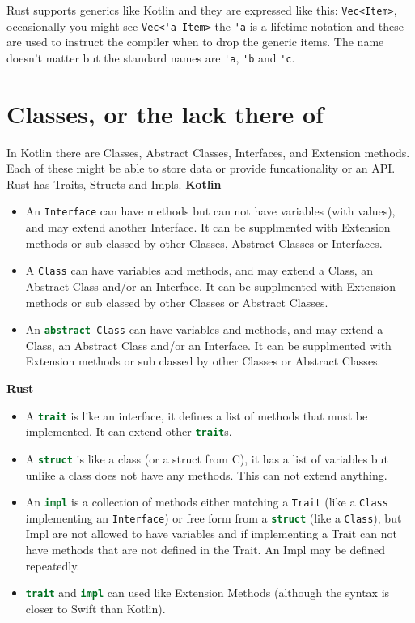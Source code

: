 \documentclass[a4paper,11pt]{article}
\begin{document}
Rust supports generics like Kotlin and they are expressed like this: \lstinline{Vec<Item>}, occasionally you might see \lstinline{Vec<'a Item>} the \lstinline{'a} is a lifetime notation and these are used to instruct the compiler when to drop the generic items. The name doesn't matter but the standard names are \lstinline{'a}, \lstinline{'b} and \lstinline{'c}.

\newpage
\section{Classes, or the lack there of}

In Kotlin there are Classes, Abstract Classes, Interfaces, and Extension methods. Each of these might be able to store data or provide funcationality or an API.
Rust has Traits, Structs and Impls.
\newline
\textbf{Kotlin}
\begin{itemize}
  \item An \lstinline[language=Kotlin]{Interface} can have methods but can not have variables (with values), and may extend another Interface. It can be supplmented with Extension methods or sub classed by other Classes, Abstract Classes or Interfaces.
  \item A \lstinline[language=Kotlin]{Class} can have variables and methods, and may extend a Class, an Abstract Class and/or an Interface. It can be supplmented with Extension methods or sub classed by other Classes or Abstract Classes.
  \item An \lstinline[language=Kotlin]{abstract Class} can have variables and methods, and may extend a Class, an Abstract Class and/or an Interface. It can be supplmented with Extension methods or sub classed by other Classes or Abstract Classes.
\end{itemize}
\textbf{Rust}
\begin{itemize}
  \item A \lstinline[language=Rust]{trait} is like an interface, it defines a list of methods that must be implemented. It can extend other \lstinline[language=Rust]{trait}s.
  \item A \lstinline[language=Rust]{struct} is like a class (or a struct from C), it has a list of variables but unlike a class does not have any methods. This can not extend anything.
  \item An \lstinline[language=Rust]{impl} is a collection of methods either matching a \lstinline[language=Rust]{Trait} (like a \lstinline[language=Kotlin]{Class} implementing an \lstinline[language=Kotlin]{Interface}) or free form from a \lstinline[language=Rust]{struct} (like a \lstinline[language=Kotlin]{Class}), but Impl are not allowed to have variables and if implementing a Trait can not have methods that are not defined in the Trait. An Impl may be defined repeatedly.
  \item \lstinline[language=Rust]{trait} and \lstinline[language=Rust]{impl} can used like Extension Methods (although the syntax is closer to Swift than Kotlin).
\end{itemize}
\end{document}
